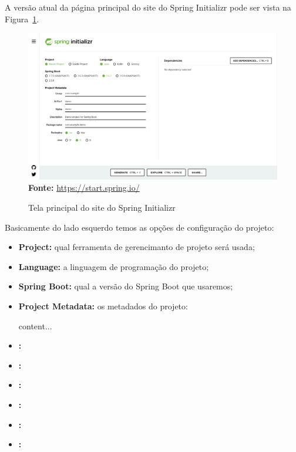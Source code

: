 A versão atual da página principal do site do Spring Initializr pode ser vista na Figura~\ref{fig:cap10SpringInitializr}.

\FloatBarrier
\begin{figure}[!htbp]
    \centering
    \caption{Tela principal do site do Spring Initializr}
    \includegraphics[scale=0.4]{imagens/cap10SpringInitializr}
    \\\textbf{Fonte:} \url{https://start.spring.io/}
    \label{fig:cap10SpringInitializr}
\end{figure}
\FloatBarrier

Basicamente do lado esquerdo temos as opções de configuração do projeto:
\begin{itemize}
    \item \textbf{Project:} qual ferramenta de gerencimanto de projeto será usada;
    \item \textbf{Language:} a linguagem de programação do projeto;
    \item \textbf{Spring Boot:} qual a versão do Spring Boot que usaremos;
    \item \textbf{Project Metadata:} os metadados do projeto:
    \begin{itemize}
    content...
    \end{itemize}
    \item \textbf{:}
    \item \textbf{:}
    \item \textbf{:}
    \item \textbf{:}
    \item \textbf{:}
    \item \textbf{:}
\end{itemize}


